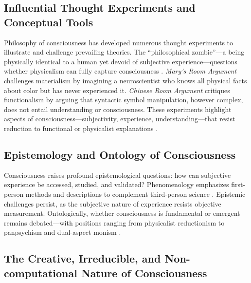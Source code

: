 \subsection{Influential Thought Experiments and Conceptual Tools}

Philosophy of consciousness has developed numerous thought experiments to illustrate and challenge prevailing theories. The ``philosophical zombie''---a being physically identical to a human yet devoid of subjective experience---questions whether physicalism can fully capture consciousness \cite{chalmers1996conscious,kirk1974zombies}. \emph{Mary's Room Argument} \cite{jackson1982epiphenomenal} challenges materialism by imagining a neuroscientist who knows all physical facts about color but has never experienced it. \emph{Chinese Room Argument} \cite{searle1980minds} critiques functionalism by arguing that syntactic symbol manipulation, however complex, does not entail understanding or consciousness. These experiments highlight aspects of consciousness---subjectivity, experience, understanding---that resist reduction to functional or physicalist explanations \cite{francken2022consciousness}.

\subsection{Epistemology and Ontology of Consciousness}

Consciousness raises profound epistemological questions: how can subjective experience be accessed, studied, and validated? Phenomenology emphasizes first-person methods and descriptions to complement third-person science \cite{gallagher2022phenomenology}. Epistemic challenges persist, as the subjective nature of experience resists objective measurement. Ontologically, whether consciousness is fundamental or emergent remains debated---with positions ranging from physicalist reductionism to panpsychism and dual-aspect monism \cite{chalmers2016combination,strawson2008realistic}.

\subsection{The Creative, Irreducible, and Non-computational Nature of Consciousness}

